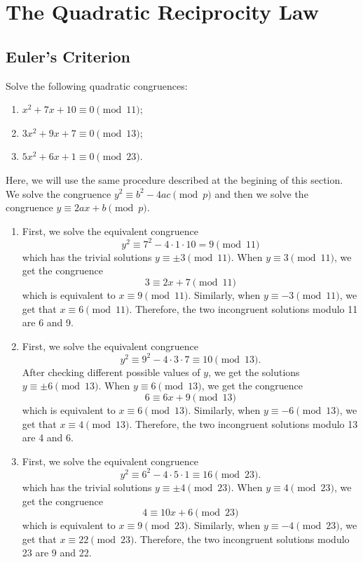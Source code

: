 \chapter{The Quadratic Reciprocity Law}

\section{Euler's Criterion}

\begin{exercise}
    Solve the following quadratic congruences:
    \begin{enumerate}
        \item $x^2 + 7x + 10 \equiv 0 \pmod{11}$;
        \item $3x^2 + 9x + 7 \equiv 0 \pmod{13}$;
        \item $5x^2 + 6x + 1 \equiv 0 \pmod{23}$.\\
    \end{enumerate}
\end{exercise}

\begin{solution}
    Here, we will use the same procedure described at the begining of this section. We solve the congruence $y^2 \equiv b^2 - 4ac \pmod p$ and then we solve the congruence $y \equiv 2ax + b \pmod{p}$.
    \begin{enumerate}
        \item First, we solve the equivalent congruence
        $$y^2 \equiv 7^2 - 4\cdot 1 \cdot 10 = 9 \pmod{11}$$
        which has the trivial solutions $y \equiv \pm 3 \pmod{11}$. When $y \equiv 3 \pmod{11}$, we get the congruence
        $$3 \equiv 2x + 7 \pmod{11}$$
        which is equivalent to $x \equiv 9 \pmod{11}$. Similarly, when $y \equiv -3 \pmod{11}$, we get that $x \equiv 6 \pmod{11}$. Therefore, the two incongruent solutions modulo 11 are 6 and 9.
        \item First, we solve the equivalent congruence
        $$y^2 \equiv 9^2 - 4\cdot 3 \cdot 7 \equiv 10 \pmod{13}.$$
        After checking different possible values of $y$, we get the solutions $y \equiv \pm 6 \pmod{13}$. When $y \equiv 6 \pmod{13}$, we get the congruence
        $$6 \equiv 6x + 9 \pmod{13}$$
        which is equivalent to $x \equiv 6 \pmod{13}$. Similarly, when $y \equiv -6 \pmod{13}$, we get that $x \equiv 4 \pmod{13}$. Therefore, the two incongruent solutions modulo 13 are 4 and 6.
        \item First, we solve the equivalent congruence
        $$y^2 \equiv 6^2 - 4\cdot 5 \cdot 1 \equiv 16 \pmod{23}.$$
        which has the trivial solutions $y \equiv \pm 4 \pmod{23}$. When $y \equiv 4 \pmod{23}$, we get the congruence
        $$4 \equiv 10x + 6 \pmod{23}$$
        which is equivalent to $x \equiv 9 \pmod{23}$. Similarly, when $y \equiv -4 \pmod{23}$, we get that $x \equiv 22 \pmod{23}$. Therefore, the two incongruent solutions modulo 23 are 9 and 22. \\
    \end{enumerate}
\end{solution}

